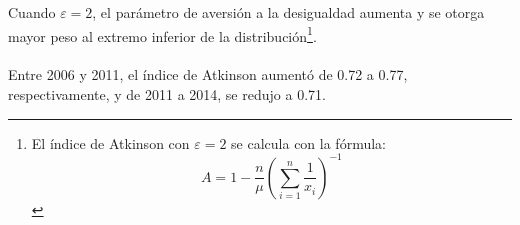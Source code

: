 Cuando $\varepsilon = \mbox{2}$, el parámetro de aversión a la desigualdad aumenta y se otorga mayor peso al extremo inferior de la distribución\footnote{El índice de Atkinson con $\varepsilon = \mbox{2} $ se calcula con la fórmula: 
	\[ A = 1 - \frac{n}{\mu}\left( \sum_{i=1}^{n}\frac{1}{x_i} \right)^{-1} \]}. \\\\ Entre 2006 y 2011, el índice de Atkinson aumentó de 0.72 a 0.77, respectivamente, y de 2011 a 2014, se redujo a 0.71.  
